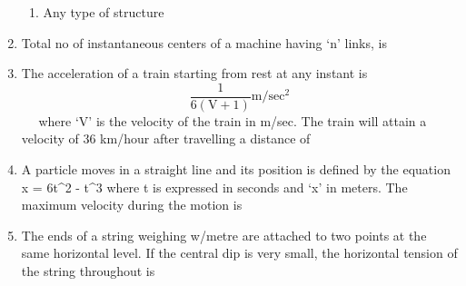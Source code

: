 \documentclass[11pt,a4paper]{article}
\begin{document}
\begin{enumerate}
\begin{enumerate}[label=\Alph*.]
\item{Any type of structure}
\end{enumerate}
\item{Total no of instantaneous centers of a machine having `n' links, is
}
\\
\item{The acceleration of a train starting from rest at any instant is $$\frac{1}{{6\left( {{\text{V}} + 1} \right)}}{\text{m/se}}{{\text{c}}^2}$$ ~ ~where `V' is the velocity of the train in m/sec. The train will attain a velocity of 36 km/hour after travelling a distance of
}
\\
\item{A particle moves in a straight line and its position is defined by the equation x = 6t\^{}2 - t\^{}3 where t is expressed in seconds and `x' in meters. The maximum velocity during the motion is
}
\\
\item{The ends of a string weighing w/metre are attached to two points at the same horizontal level. If the central dip is very small, the horizontal tension of the string throughout is}
\\
\end{enumerate}
\end{document}
